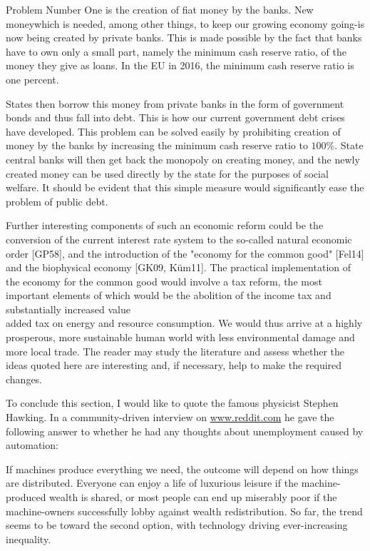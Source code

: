 \documentclass[10pt]{book}
\begin{document}
Problem Number One is the creation of fiat money by the banks. New moneywhich is needed, among other things, to keep our growing economy going-is now being created by private banks. This is made possible by the fact that banks have to own only a small part, namely the minimum cash reserve ratio, of the money they give as loans. In the EU in 2016, the minimum cash reserve ratio is one percent.

States then borrow this money from private banks in the form of government bonds and thus fall into debt. This is how our current government debt crises have developed. This problem can be solved easily by prohibiting creation of money by the banks by increasing the minimum cash reserve ratio to $100 \%$. State central banks will then get back the monopoly on creating money, and the newly created money can be used directly by the state for the purposes of social welfare. It should be evident that this simple measure would significantly ease the problem of public debt.

Further interesting components of such an economic reform could be the conversion of the current interest rate system to the so-called natural economic order [GP58], and the introduction of the "economy for the common good" [Fel14] and the biophysical economy [GK09, Küm11]. The practical implementation of the economy for the common good would involve a tax reform, the most important elements of which would be the abolition of the income tax and substantially increased value\\
added tax on energy and resource consumption. We would thus arrive at a highly prosperous, more sustainable human world with less environmental damage and more local trade. The reader may study the literature and assess whether the ideas quoted here are interesting and, if necessary, help to make the required changes.


To conclude this section, I would like to quote the famous physicist Stephen Hawking. In a community-driven interview on \href{http://www.reddit.com}{www.reddit.com} he gave the following answer to whether he had any thoughts about unemployment caused by automation:

\begin{displayquote}
If machines produce everything we need, the outcome will depend on how things are distributed. Everyone can enjoy a life of luxurious leisure if the machine-produced wealth is shared, or most people can end up miserably poor if the machine-owners successfully lobby against wealth redistribution. So far, the trend seems to be toward the second option, with technology driving ever-increasing inequality.
\end{displayquote}
\end{document}
